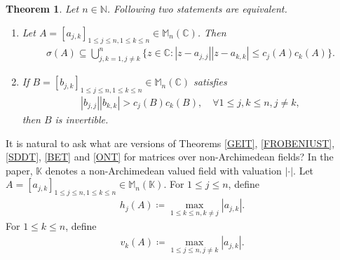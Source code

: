 \documentclass{amsart}
\newtheorem{theorem}{Theorem}[section]
\begin{document}
\begin{theorem} \cite{VARGA}
	Let $n \in \mathbb{N}$.  Following two statements are equivalent. 
	\begin{enumerate}[\upshape(i)]
		\item Let $A=[a_{j,k}]_{1\leq j\leq n, 1\leq k \leq n}\in  \mathbb{M}_n(\mathbb{C})$. Then 
		\begin{align*}
			\sigma(A)\subseteq \bigcup_{j,k=1, j \neq k}^n\{z \in \mathbb{C}: |z-a_{j, j}||z-a_{k,k}|\leq c_j(A)c_k(A)\}.
		\end{align*}
		\item 	If  $B=[b_{j,k}]_{1\leq j\leq n, 1\leq k \leq n}\in  \mathbb{M}_n(\mathbb{C})$ satisfies
		\begin{align*}
			|b_{j,j}||b_{k,k}|>	c_j(B)c_k(B), \quad \forall 1\leq j, k \leq n, j \neq k,
		\end{align*}
		then $B$ is invertible. 
	\end{enumerate}	
\end{theorem}
It is natural to ask what are versions of Theorems \ref{GEIT}, \ref{FROBENIUST}, \ref{SDDT}, \ref{BET} and \ref{ONT}  for matrices over non-Archimedean fields? 
In the paper,  $\mathbb{K}$ denotes a non-Archimedean valued field with valuation $|\cdot|$. Let $A=[a_{j,k}]_{1\leq j\leq n, 1\leq k \leq n} \in \mathbb{M}_n(\mathbb{K})$. For $1\leq j \leq n$, define 
\begin{align*}
	h_j(A)\coloneqq\max_{1\leq k \leq n, k \neq j}|a_{j,k}|.
\end{align*}
For $1\leq k \leq n$, define 
\begin{align*}
	v_k(A)\coloneqq\max_{1\leq j \leq n, j \neq k}|a_{j,k}|.
\end{align*}
\end{document}
